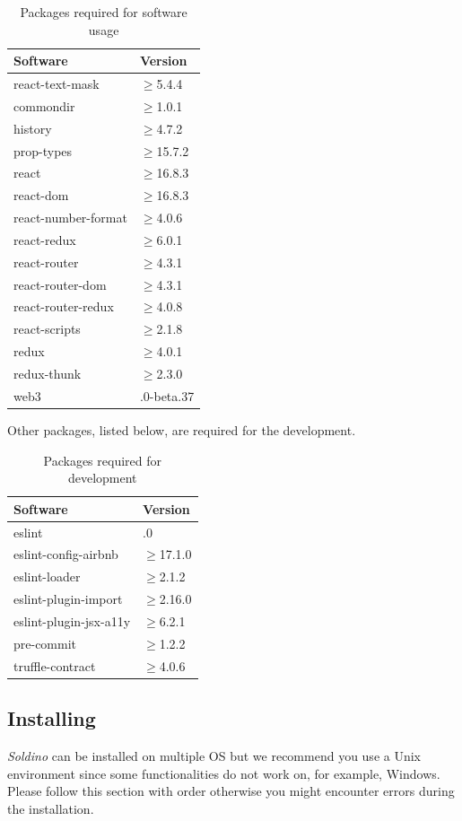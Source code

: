 \renewcommand{\arraystretch}{1.5}
\begin{longtable}{ 
		>{\centering}p{} 
		>{\centering}p{}
	}
	\caption{Packages required for software usage}\\
	\rowcolorhead
	\textbf{\color{white}Software} & 
	\textbf{\color{white}Version}
	\tabularnewline  
	\endhead	
	


	react-text-mask & $\geq$5.4.4
	\tabularnewline
	commondir &$\geq$1.0.1
	\tabularnewline
	history &$\geq$4.7.2
	\tabularnewline
	prop-types &$\geq$15.7.2\tabularnewline
	react &$\geq$16.8.3\tabularnewline
	react-dom &$\geq$16.8.3\tabularnewline
	react-number-format &$\geq$4.0.6\tabularnewline
	react-redux &$\geq$6.0.1\tabularnewline
	react-router &$\geq$4.3.1\tabularnewline
	react-router-dom &$\geq$4.3.1\tabularnewline
	react-router-redux &$\geq$4.0.8\tabularnewline
	react-scripts &$\geq$2.1.8\tabularnewline
	redux &$\geq$4.0.1\tabularnewline
	redux-thunk &$\geq$2.3.0\tabularnewline
	web3 & 1.0.0-beta.37\tabularnewline
	
\end{longtable}

Other packages, listed below, are required for the development.
\renewcommand{\arraystretch}{1.5}
\begin{longtable}{ 
		>{\centering}p{} 
		>{\centering}p{}
	}
	\caption{Packages required for development}\\
	\rowcolorhead
	\textbf{\color{white}Software} & 
	\textbf{\color{white}Version}
	\tabularnewline  
	\endhead	
	
	eslint & 5.12.0\tabularnewline
	eslint-config-airbnb &$\geq$17.1.0\tabularnewline
	eslint-loader & $\geq$2.1.2\tabularnewline
	eslint-plugin-import & $\geq$2.16.0\tabularnewline
	eslint-plugin-jsx-a11y & $\geq$6.2.1\tabularnewline
	pre-commit & $\geq$1.2.2\tabularnewline
	truffle-contract & $\geq$4.0.6
	
\end{longtable}

\subsection{Installing}
\textit{Soldino} can be installed on multiple OS but we recommend you use a 
Unix environment since some functionalities do not work on, for example, 
Windows.\\
Please follow this section with order otherwise you might encounter 
errors during the installation.
